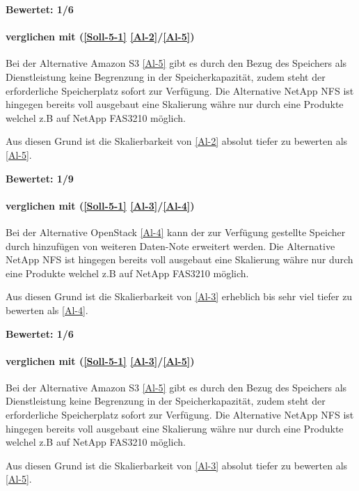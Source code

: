 \textbf{Bewertet: 1/6}

\paragraph*{  verglichen mit  (\ref{Soll-5-1} \ref{Al-2}/\ref{Al-5})}
Bei der Alternative Amazon S3 \ref{Al-5} gibt es durch den Bezug des Speichers als Dienstleistung keine Begrenzung in der Speicherkapazität, zudem steht der erforderliche Speicherplatz sofort zur Verfügung. Die Alternative NetApp NFS ist hingegen bereits voll ausgebaut eine Skalierung währe nur durch eine Produkte welchel z.B auf NetApp FAS3210 möglich.

Aus diesen Grund ist die Skalierbarkeit von  \ref{Al-2} absolut tiefer zu bewerten als  \ref{Al-5}.

\textbf{Bewertet: 1/9}

\paragraph*{  verglichen mit  (\ref{Soll-5-1} \ref{Al-3}/\ref{Al-4})}
Bei der Alternative OpenStack \ref{Al-4} kann der zur Verfügung gestellte Speicher durch hinzufügen von weiteren Daten-Note erweitert werden. Die Alternative NetApp NFS ist hingegen bereits voll ausgebaut eine Skalierung währe nur durch eine Produkte welchel z.B auf NetApp FAS3210 möglich.

Aus diesen Grund ist die Skalierbarkeit von  \ref{Al-3} erheblich bis sehr viel tiefer zu bewerten als  \ref{Al-4}.

\textbf{Bewertet: 1/6}

\paragraph*{  verglichen mit  (\ref{Soll-5-1} \ref{Al-3}/\ref{Al-5})}

Bei der Alternative Amazon S3 \ref{Al-5} gibt es durch den Bezug des Speichers als Dienstleistung keine Begrenzung in der Speicherkapazität, zudem steht der erforderliche Speicherplatz sofort zur Verfügung. Die Alternative NetApp NFS ist hingegen bereits voll ausgebaut eine Skalierung währe nur durch eine Produkte welchel z.B auf NetApp FAS3210 möglich.

Aus diesen Grund ist die Skalierbarkeit von  \ref{Al-3} absolut tiefer zu bewerten als  \ref{Al-5}.

